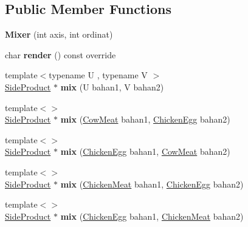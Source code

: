 \subsection*{Public Member Functions}
\begin{DoxyCompactItemize}
\item 
\mbox{\label{class_mixer_a82ed15642998209ea4b8775b7c9b2787}} 
{\bfseries Mixer} (int axis, int ordinat)
\item 
\mbox{\label{class_mixer_a6e934b686923fe1dc274a260421b8991}} 
char {\bfseries render} () const override
\item 
\mbox{\label{class_mixer_afbad650f8ed72363d95de64de3f3a4c0}} 
{\footnotesize template$<$typename U , typename V $>$ }\\\mbox{\hyperlink{class_side_product}{Side\+Product}} $\ast$ {\bfseries mix} (U bahan1, V bahan2)
\item 
\mbox{\label{class_mixer_ab72245f5da32684695ba82ec596ab254}} 
{\footnotesize template$<$$>$ }\\\mbox{\hyperlink{class_side_product}{Side\+Product}} $\ast$ {\bfseries mix} (\mbox{\hyperlink{class_cow_meat}{Cow\+Meat}} bahan1, \mbox{\hyperlink{class_chicken_egg}{Chicken\+Egg}} bahan2)
\item 
\mbox{\label{class_mixer_a4d7804359ccadea73d5dac30b9f0000c}} 
{\footnotesize template$<$$>$ }\\\mbox{\hyperlink{class_side_product}{Side\+Product}} $\ast$ {\bfseries mix} (\mbox{\hyperlink{class_chicken_egg}{Chicken\+Egg}} bahan1, \mbox{\hyperlink{class_cow_meat}{Cow\+Meat}} bahan2)
\item 
\mbox{\label{class_mixer_a994035c6c02e31b3653226330a907035}} 
{\footnotesize template$<$$>$ }\\\mbox{\hyperlink{class_side_product}{Side\+Product}} $\ast$ {\bfseries mix} (\mbox{\hyperlink{class_chicken_meat}{Chicken\+Meat}} bahan1, \mbox{\hyperlink{class_chicken_egg}{Chicken\+Egg}} bahan2)
\item 
\mbox{\label{class_mixer_a7fda183574386dc561ac0551f10aa04a}} 
{\footnotesize template$<$$>$ }\\\mbox{\hyperlink{class_side_product}{Side\+Product}} $\ast$ {\bfseries mix} (\mbox{\hyperlink{class_chicken_egg}{Chicken\+Egg}} bahan1, \mbox{\hyperlink{class_chicken_meat}{Chicken\+Meat}} bahan2)

\end{DoxyCompactItemize}
